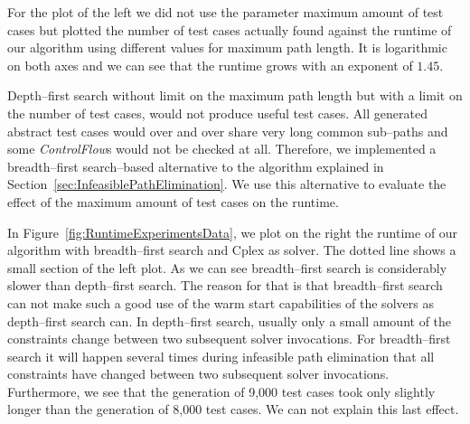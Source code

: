 \documentclass[runningheads,a4paper]{llncs}%
\newcommand{\UMLType}[1]{\textsf{\textit{#1}}} %
\begin{document}
For the plot of the left we did not use the parameter maximum amount of test
cases but plotted the number of test cases actually found against the runtime of
our algorithm using different values for maximum path length. It is logarithmic
on both axes and we can see that the runtime grows with an exponent of $1.45$.

Depth--first search without limit on the maximum path length but with a limit on
the number of test cases, would not produce useful test cases. All generated
abstract test cases would over and over share very long common sub--paths and
some \UMLType{ControlFlow}s would not be checked at all. Therefore, we
implemented a breadth--first search--based alternative to the algorithm
explained in Section~\ref{sec:InfeasiblePathElimination}. We use this
alternative to evaluate the effect of the maximum amount of test cases on the
runtime.

In Figure~\ref{fig:RuntimeExperimentsData}, we plot on the right the runtime of
our algorithm with breadth--first search and Cplex as solver. The dotted line
shows a small section of the left plot. As we can see breadth--first search is
considerably slower than depth--first search. The reason for that is that
breadth--first search can not make such a good use of the warm start
capabilities of the solvers as depth--first search can. In depth--first search,
usually only a small amount of the constraints change between two subsequent
solver invocations. For breadth--first search it will happen several times
during infeasible path elimination that all constraints have changed between two
subsequent solver invocations. Furthermore, we see that the generation of 9,000
test cases took only slightly longer than the generation of 8,000 test cases. We
can not explain this last effect.
\end{document}
